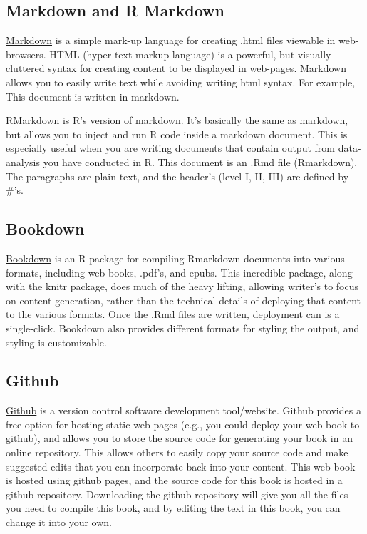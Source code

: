 \documentclass[]{book}
\theoremstyle{definition}
\theoremstyle{definition}
\theoremstyle{definition}
\theoremstyle{remark}
\begin{document}
\subsection{Markdown and R Markdown}\label{markdown-and-r-markdown}

\href{https://github.com/adam-p/markdown-here/wiki/Markdown-Cheatsheet}{Markdown}
is a simple mark-up language for creating .html files viewable in
web-browsers. HTML (hyper-text markup language) is a powerful, but
visually cluttered syntax for creating content to be displayed in
web-pages. Markdown allows you to easily write text while avoiding
writing html syntax. For example, This document is written in markdown.

\href{http://rmarkdown.rstudio.com}{RMarkdown} is R's version of
markdown. It's basically the same as markdown, but allows you to inject
and run R code inside a markdown document. This is especially useful
when you are writing documents that contain output from data-analysis
you have conducted in R. This document is an .Rmd file (Rmarkdown). The
paragraphs are plain text, and the header's (level I, II, III) are
defined by \#'s.

\subsection{Bookdown}\label{bookdown}

\href{https://bookdown.org/yihui/bookdown/}{Bookdown} is an R package
for compiling Rmarkdown documents into various formats, including
web-books, .pdf's, and epubs. This incredible package, along with the
knitr package, does much of the heavy lifting, allowing writer's to
focus on content generation, rather than the technical details of
deploying that content to the various formats. Once the .Rmd files are
written, deployment can is a single-click. Bookdown also provides
different formats for styling the output, and styling is customizable.

\subsection{Github}\label{github}

\href{https://github.com}{Github} is a version control software
development tool/website. Github provides a free option for hosting
static web-pages (e.g., you could deploy your web-book to github), and
allows you to store the source code for generating your book in an
online repository. This allows others to easily copy your source code
and make suggested edits that you can incorporate back into your
content. This web-book is hosted using github pages, and the source code
for this book is hosted in a github repository. Downloading the github
repository will give you all the files you need to compile this book,
and by editing the text in this book, you can change it into your own.
\end{document}
